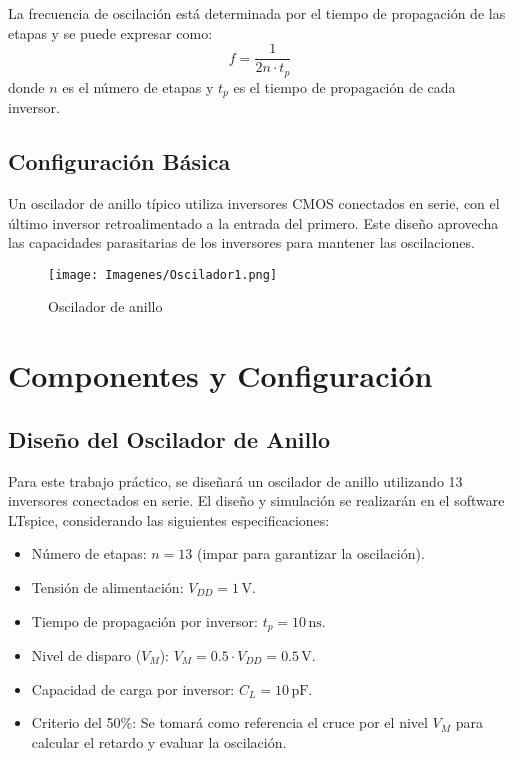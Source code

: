 \documentclass[11pt, a4paper]{article}
\begin{document}
La frecuencia de oscilación está determinada por el tiempo de propagación de las etapas y se puede expresar como:
\[
f = \frac{1}{2n \cdot t_p}
\]
donde \(n\) es el número de etapas y \(t_p\) es el tiempo de propagación de cada inversor.

\subsection{Configuración Básica}

Un oscilador de anillo típico utiliza inversores CMOS conectados en serie, con el último inversor retroalimentado a la entrada del primero. Este diseño aprovecha las capacidades parasitarias de los inversores para mantener las oscilaciones.


   \begin{figure}[H]
    \centering
    \texttt{[image: Imagenes/Oscilador1.png]}
    \caption{Oscilador de anillo}
    \label{fig:Oscilador1}
    \end{figure}
 
\section{Componentes y Configuración}

\subsection{Diseño del Oscilador de Anillo}

Para este trabajo práctico, se diseñará un oscilador de anillo utilizando 13 inversores conectados en serie. El diseño y simulación se realizarán en el software LTspice, considerando las siguientes especificaciones:

\begin{itemize}
    \item Número de etapas: \( n = 13 \) (impar para garantizar la oscilación).
    \item Tensión de alimentación: \( V_{DD} = 1 \, \mathrm{V} \).
    \item Tiempo de propagación por inversor: \( t_p = 10 \, \mathrm{ns} \).
    \item Nivel de disparo (\( V_M \)): \( V_M = 0.5 \cdot V_{DD} = 0.5 \, \mathrm{V} \).
    \item Capacidad de carga por inversor: \( C_L = 10 \, \mathrm{pF} \).
    \item Criterio del 50\%: Se tomará como referencia el cruce por el nivel \( V_M \) para calcular el retardo y evaluar la oscilación.
\end{itemize}
\end{document}
